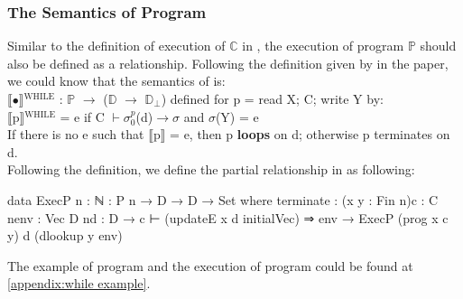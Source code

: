 \subsubsection{The Semantics of Program}
Similar to the definition of execution of $\mathds{C}$ in \WHILE, the execution of program $\mathds{P}$ should also be defined as a relationship.
Following the definition given by  in the paper\cite{jones_computability_1997}, we could know that the semantics of \WHILE is:\\
$\llbracket$$\bullet$$\rrbracket$$^{\mbox{WHILE}}$ : $\mathds{P}$ $\rightarrow$ ($\mathds{D}$ $\rightarrow$ $\mathds{D}$$_\perp$) defined for p = read X; C; write Y by:\\
$\llbracket$p$\rrbracket$$^{\mbox{WHILE}}$ = e if C $\vdash \sigma^p_0$(d)$ \rightarrow \sigma$ and $\sigma$(Y) = e\\
If there is no e such that $\llbracket$p$\rrbracket$ = e, then p \textbf{loops} on d; otherwise p terminates on d.\\
Following the definition, we define the partial relationship in \Agda as following:
\begin{code}
data ExecP {n : ℕ} : P n → D → D → Set where
  terminate : (x y : Fin n){c : C n}{env : Vec D n}{d : D}
            → c ⊢ (updateE x d initialVec) ⇒ env
            → ExecP (prog x c y) d (dlookup y env)
\end{code}
The example of \WHILE program and the execution of \WHILE program could be found at \ref{appendix:while example}.
